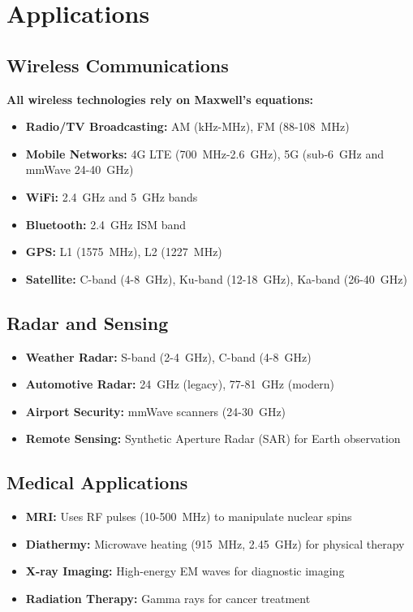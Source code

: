 \section{Applications}

\subsection{Wireless Communications}

\textbf{All wireless technologies rely on Maxwell's equations:}
\begin{itemize}
\item \textbf{Radio/TV Broadcasting:} AM (kHz-MHz), FM (88-108~MHz)
\item \textbf{Mobile Networks:} 4G LTE (700~MHz-2.6~GHz), 5G (sub-6~GHz and mmWave 24-40~GHz)
\item \textbf{WiFi:} 2.4~GHz and 5~GHz bands
\item \textbf{Bluetooth:} 2.4~GHz ISM band
\item \textbf{GPS:} L1 (1575~MHz), L2 (1227~MHz)
\item \textbf{Satellite:} C-band (4-8~GHz), Ku-band (12-18~GHz), Ka-band (26-40~GHz)
\end{itemize}

\subsection{Radar and Sensing}

\begin{itemize}
\item \textbf{Weather Radar:} S-band (2-4~GHz), C-band (4-8~GHz)
\item \textbf{Automotive Radar:} 24~GHz (legacy), 77-81~GHz (modern)
\item \textbf{Airport Security:} mmWave scanners (24-30~GHz)
\item \textbf{Remote Sensing:} Synthetic Aperture Radar (SAR) for Earth observation
\end{itemize}

\subsection{Medical Applications}

\begin{itemize}
\item \textbf{MRI:} Uses RF pulses (10-500~MHz) to manipulate nuclear spins
\item \textbf{Diathermy:} Microwave heating (915~MHz, 2.45~GHz) for physical therapy
\item \textbf{X-ray Imaging:} High-energy EM waves for diagnostic imaging
\item \textbf{Radiation Therapy:} Gamma rays for cancer treatment
\end{itemize}

